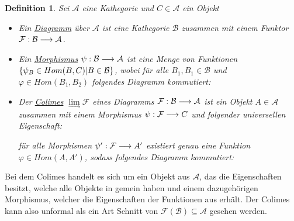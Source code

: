 \documentclass[10pt,a4paper]{report}
\newcommand{\comment}[1]{}
\newtheorem{definition}[satz]{Definition}
\newcommand{\functionfront}[3]{\nolinebreak{#1:#2 \longrightarrow #3}}
\newcommand{\colimes}[0]{\lim\limits_{ \longrightarrow }}
\begin{document}
\comment
{}
\begin{definition}
Sei $\mathcal{A}$ eine Kathegorie und $C \in \mathcal{A}$ ein Objekt
\begin{itemize}
\item Ein \underline{Diagramm} über $\mathcal{A}$ ist eine Kathegorie $\mathcal{B}$ zusammen mit einem Funktor $\functionfront{\mathcal{F}}{\mathcal{B}}{\mathcal{A}}$.
\item Ein \underline{Morphismus} $\functionfront{\psi}{\mathcal{B}}{\mathcal{A}}$ ist eine Menge von Funktionen 
$\nolinebreak{\lbrace \psi_B \in Hom(B,C) \vert B \in \mathcal{B} \rbrace}$, wobei für alle $B_1,B_1 \in \mathcal{B}$ und $\varphi \in Hom(B_1,B_2)$ folgendes Diagramm kommutiert:
\begin{center}
\end{center}
\item Der \underline{Colimes} $\colimes \mathcal{F}$ eines Diagramms $\functionfront{\mathcal{F}}{\mathcal{B}}{\mathcal{A}}$ ist ein Objekt $A \in \mathcal{A}$ zusammen mit einem Morphismus $\functionfront{\psi}{\mathcal{F}}{C}$ und folgender universellen Eigenschaft:
\begin{center}
\comment{$\forall Morphismen \functionfront{\psi '}{\mathcal{F}}{\mathcal{A}'}\exists ! \varphi \in Hom_{\mathcal{A}}(A,A') \forall B \in \mathcal{B}: \varphi \circ \psi_B = \psi'_B $}

für alle Morphismen $\functionfront{\psi '}{\mathcal{F}}{A'}$ existiert genau eine Funktion $\varphi \in Hom(A,A')$, sodass folgendes Diagramm kommutiert:
\end{center}

\end{itemize}
\end{definition}
Bei dem Colimes handelt es sich um ein Objekt aus $\mathcal{A}$, das die Eigenschaften besitzt, welche alle Objekte in  gemein haben und einem dazugehörigen Morphismus, welcher die Eigenschaften der Funktionen aus  erhält. Der Colimes kann also unformal als ein Art Schnitt von $\mathcal{F}(\mathcal{B}) \subseteq \mathcal{A}$ gesehen werden.\\
\end{document}
